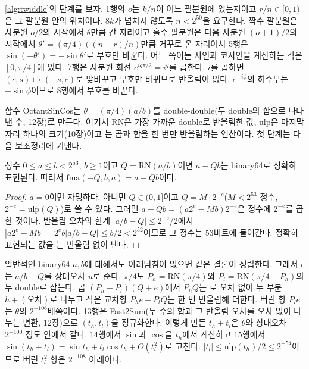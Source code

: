 \cref{alg:twiddle}의 단계를 보자. 1행의 $o$는 $k/n$이 어느 팔분원에 있는지이고 $r/n\in[0,1)$은 그 팔분원 안의 위치이다. $8k$가 넘치지 않도록 $n<2^{50}$을 요구한다. 짝수 팔분원은 사분원 $o/2$의 시작에서 $\theta$만큼 간 자리이고 홀수 팔분원은 다음 사분원 $(o+1)/2$의 시작에서 $\theta'=(\pi/4)((n-r)/n)$만큼 거꾸로 온 자리여서 5행은 $\sin(-\theta')=-\sin\theta'$로 부호만 바꾼다. 어느 쪽이든 사인과 코사인을 계산하는 각은 $[0,\pi/4]$에 있다. 7행은 사분원 회전 $e^{iq\pi/2}=i^q$를 곱한다. $i$를 곱하면 $(c,s)\mapsto(-s,c)$로 맞바꾸고 부호만 바뀌므로 반올림이 없다. $e^{-i\phi}$의 허수부는 $-\sin\phi$이므로 8행에서 부호를 바꾼다.

함수 \textrm{OctantSinCos}는 $\theta=(\pi/4)(a/b)$를 double-double(두 double의 합으로 나타낸 수, 12장)로 만든다. 여기서 $\mathrm{RN}$은 가장 가까운 double로 반올림한 값, $\mathrm{ulp}$은 마지막 자리 하나의 크기(10장)이고 는 곱과 합을 한 번만 반올림하는 연산이다. 첫 단계는 다음 보조정리에 기댄다.

\begin{lemma}
\label{lem:div-remainder}
정수 $0\le a\le b<2^{53}$, $b\ge1$이고 $Q=\mathrm{RN}(a/b)$이면 $a-Qb$는 binary64로 정확히 표현된다. 따라서 $\mathrm{fma}(-Q,b,a)=a-Qb$이다.
\end{lemma}

\begin{proof}
$a=0$이면 자명하다. 아니면 $Q\in(0,1]$이고 $Q=M\cdot2^{-e}$($M<2^{53}$ 정수, $2^{-e}=\mathrm{ulp}(Q)$)로 쓸 수 있다. 그러면 $a-Qb=(a2^e-Mb)2^{-e}$은 정수에 $2^{-e}$를 곱한 것이다. 반올림 오차의 한계 $|a/b-Q|\le2^{-e}/2$에서 $|a2^e-Mb|=2^eb|a/b-Q|\le b/2<2^{52}$이므로 그 정수는 $53$비트에 들어간다. 정확히 표현되는 값을 는 반올림 없이 낸다.
\end{proof}

일반적인 binary64 $a,b$에 대해서도 아래넘침이 없으면 같은 결론이 성립한다\cite{muller2018handbook}. 그래서 $e$는 $a/b-Q$를 상대오차 $u$로 준다. $\pi/4$도 $P_h=\mathrm{RN}(\pi/4)$와 $P_l=\mathrm{RN}(\pi/4-P_h)$의 두 double로 잡는다. 곱 $(P_h+P_l)(Q+e)$에서 $P_hQ$는 로 오차 없이 두 부분 $h+(\text{오차})$로 나누고 작은 교차항 $P_he+P_lQ$는 한 번 반올림해 더한다. 버린 항 $P_le$는 $\theta$의 $2^{-106}$배쯤이다. 13행은 Fast2Sum(두 수의 합과 그 반올림 오차를 오차 없이 나누는 변환, 12장)으로 $(t_h,t_l)$을 정규화한다. 이렇게 만든 $t_h+t_l$은 $\theta$와 상대오차 $2^{-100}$ 정도 안에서 같다. 14행에서 $\sin$과 $\cos$을 $t_h$에서 계산하고 15행에서 $\sin(t_h+t_l)=\sin t_h+t_l\cos t_h+O(t_l^2)$로 고친다. $|t_l|\le\mathrm{ulp}(t_h)/2\le2^{-54}$이므로 버린 $t_l^2$ 항은 $2^{-108}$ 아래이다.


